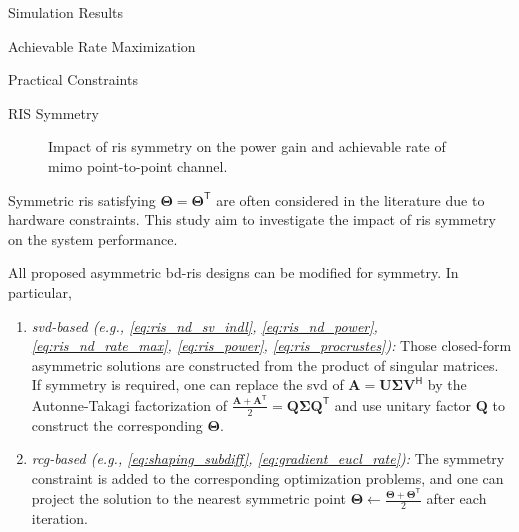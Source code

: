 \documentclass[journal]{IEEEtran}
\begin{document}
\begin{section}{Simulation Results}
\begin{subsection}{Achievable Rate Maximization}
	\end{subsection}

	\begin{subsection}{Practical Constraints}
		\begin{subsubsection}{RIS Symmetry}
			\label{sc:ris_symmetry}
			\begin{figure}[!t]
				\centering
				\caption{
					Impact of \gls{ris} symmetry on the power gain and achievable rate of \gls{mimo} point-to-point channel.
				}
			\end{figure}
			Symmetric \gls{ris} satisfying $\mathbf{\Theta} = \mathbf{\Theta}^\mathsf{T}$ are often considered in the literature due to hardware constraints.
			This study aim to investigate the impact of \gls{ris} symmetry on the system performance.
			\begin{remark}
				All proposed asymmetric \gls{bd}-\gls{ris} designs can be modified for symmetry. In particular,
				\begin{enumerate}[label=(\roman*)]
					\item \emph{\gls{svd}-based (e.g., \eqref{eq:ris_nd_sv_indl}, \eqref{eq:ris_nd_power}, \eqref{eq:ris_nd_rate_max}, \eqref{eq:ris_power}, \eqref{eq:ris_procrustes}):} Those closed-form asymmetric solutions are constructed from the product of singular matrices. If symmetry is required, one can replace the \gls{svd} of $\mathbf{A} = \mathbf{U} \mathbf{\Sigma} \mathbf{V}^\mathsf{H}$ by the Autonne-Takagi factorization of $\frac{\mathbf{A} + \mathbf{A}^\mathsf{T}}{2} = \mathbf{Q} \mathbf{\Sigma} \mathbf{Q}^\mathsf{T}$ \cite{Ikramov2012} and use unitary factor $\mathbf{Q}$ to construct the corresponding $\mathbf{\Theta}$. \label{it:takagi}
					\item \emph{\gls{rcg}-based (e.g., \eqref{eq:shaping_subdiff}, \eqref{eq:gradient_eucl_rate}):} The symmetry constraint is added to the corresponding optimization problems, and one can project the solution to the nearest symmetric point $\mathbf{\Theta} \gets \frac{\mathbf{\Theta} + \mathbf{\Theta}^\mathsf{T}}{2}$ after each iteration. \label{it:projection}
				\end{enumerate}
			\end{remark}


\end{subsubsection}
\end{subsection}
\end{section}
\end{document}
